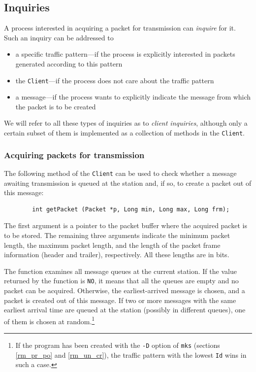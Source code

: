 \subsection{Inquiries}
\label{rm_cl_in}

A process interested in acquiring a packet for transmission can {\em inquire\/}
for it.
Such an inquiry can be addressed to
\begin{itemize}
\item
a specific traffic pattern---if the process
is explicitly interested in packets generated according to this pattern
\item
the {\tt Client}---if the process does not care about the traffic
pattern
\item
a message---if the process wants to explicitly indicate the message from
which the packet is to be created
\end{itemize}
\noindent
We will refer to all these types of inquiries as to {\em client inquiries},
although only a certain subset of them is implemented as a collection of
methods in the {\tt Client}.

\subsubsection{Acquiring packets for transmission}
\label{rm_cl_in_ap}

The following method of the {\tt Client} can be used to check whether a
message awaiting transmission is queued at the station and, if so, to 
create a packet out of this message:
\begin{verbatim}
        int getPacket (Packet *p, Long min, Long max, Long frm);
\end{verbatim}

\noindent
The first argument is a pointer to the packet buffer where
the acquired packet is to be stored.
The remaining three arguments indicate the minimum packet length,
the maximum packet length, and the length of the packet frame information
(header and trailer), respectively.
All these lengths are in bits.

The function examines all message queues at the current station.
If the value returned by the function is {\tt NO},
it means that all the queues are empty and no packet can be acquired.
Otherwise, the earliest-arrived message is chosen, and a packet is created
out of this message.
If two or more messages with the same earliest arrival time are queued at
the station (possibly in different queues),
one of them is chosen at random.\footnote{If the program has been created
with the {\tt -D} option of {\tt mks} (sections \ref{rm_pr_po}
and \ref{rm_un_cr}), the traffic pattern with the lowest {\tt Id} wins in
such a case.}


